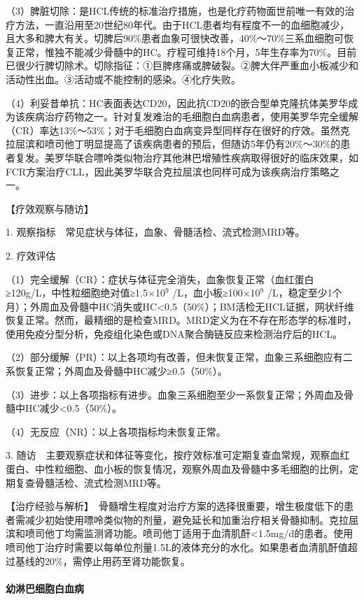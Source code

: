 （3）脾脏切除：是HCL传统的标准治疗措施，也是化疗药物面世前唯一有效的治疗方法，一直沿用至20世纪80年代。由于HCL患者均有程度不一的血细胞减少，且大多和脾大有关。切脾后90\%患者血象可很快改善，40\%～70\%三系血细胞可恢复正常，惟独不能减少骨髓中的HC。疗程可维持18个月，5年生存率为70\%。目前已很少行脾切除术。切除指征：①巨脾疼痛或脾破裂。②脾大伴严重血小板减少和活动性出血。③活动或不能控制的感染。④化疗失败。

（4）利妥昔单抗：HC表面表达CD20，因此抗CD20的嵌合型单克隆抗体美罗华成为该疾病治疗药物之一。针对复发难治的毛细胞白血病患者，使用美罗华完全缓解（CR）率达13\%～53\%；对于毛细胞白血病变异型同样存在很好的疗效。虽然克拉屈滨和喷司他丁明显提高了该疾病患者的预后，但随访5年仍有20\%～30\%的患者复发。美罗华联合嘌呤类似物治疗其他淋巴增殖性疾病取得很好的临床效果，如FCR方案治疗CLL，因此美罗华联合克拉屈滨也同样可成为该疾病治疗策略之一。

【疗效观察与随访】

1. 观察指标　常见症状与体征，血象、骨髓活检、流式检测MRD等。

2. 疗效评估

（1）完全缓解（CR）：症状与体征完全消失，血象恢复正常（血红蛋白≥120g/L，中性粒细胞绝对值≥1.5×10$^{9}$
/L，血小板≥100×10$^{9}$
/L，稳定至少1个月）；外周血及骨髓中HC消失或HC<0.5（50\%）；BM活检无HCL证据，网状纤维恢复正常。然而，最精细的是检查MRD。MRD定义为在不存在形态学的标准时，使用免疫分型分析，免疫组化染色或DNA聚合酶链反应来检测治疗后的HCL。

（2）部分缓解（PR）：以上各项均有改善，但未恢复正常，血象三系细胞应有二系恢复正常；外周血及骨髓中HC减少≥0.5（50\%）。

（3）进步：以上各项指标有进步。血象三系细胞至少一系恢复正常；外周血及骨髓中HC减少<0.5（50\%）。

（4）无反应（NR）：以上各项指标均未恢复正常。

3.
随访　主要观察症状和体征等变化，按疗效标准可定期复查血常规，观察血红蛋白、中性粒细胞、血小板的恢复情况，观察外周血及骨髓中多毛细胞的比例，定期复查骨髓活检、流式检测MRD等。

【治疗经验与解析】　骨髓增生程度对治疗方案的选择很重要，增生极度低下的患者需减少初始使用嘌呤类似物的剂量，避免延长和加重治疗相关骨髓抑制。克拉屈滨和喷司他丁均需监测肾功能。喷司他丁适用于血清肌酐<1.5mg/d的患者。使用喷司他丁治疗时需要以每单位剂量1.5L的液体充分的水化。如果患者血清肌酐值超过基线的20\%，需停止用药至肾功能恢复。

\paragraph{幼淋巴细胞白血病}

